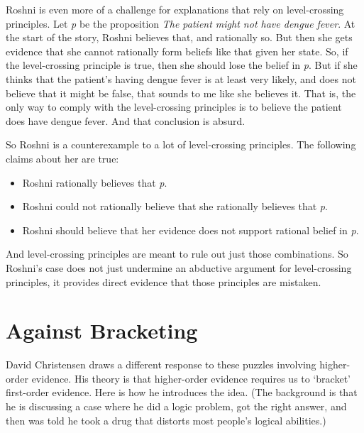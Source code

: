 \documentclass[
  10pt,
  letterpaper,
  twoside]{scrbook}
\providecommand{\tightlist}{%
  \setlength{\itemsep}{0pt}\setlength{\parskip}{0pt}}\usepackage{longtable,booktabs,array}
\begin{document}
{Roshni} is even more of a challenge for explanations that rely on
level-crossing principles. Let \emph{p} be the proposition \emph{The
patient might not have dengue fever}. At the start of the story,
{Roshni} believes that, and rationally so. But then she gets evidence
that she cannot rationally form beliefs like that given her state. So,
if the level-crossing principle is true, then she should lose the belief
in \emph{p}. But if she thinks that the patient's having dengue fever is
at least very likely, and does not believe that it might be false, that
sounds to me like she believes it. That is, the only way to comply with
the level-crossing principles is to believe the patient does have dengue
fever. And that conclusion is absurd.

So {Roshni} is a counterexample to a lot of level-crossing principles.
The following claims about her are true:

\begin{itemize}
\tightlist
\item
  {Roshni} rationally believes that \emph{p}.
\item
  {Roshni} could not rationally believe that she rationally believes
  that \emph{p}.
\item
  {Roshni} should believe that her evidence does not support rational
  belief in \emph{p}.
\end{itemize}

And level-crossing principles are meant to rule out just those
combinations. So {Roshni}'s case does not just undermine an abductive
argument for level-crossing principles, it provides direct evidence that
those principles are mistaken.

\section{Against Bracketing}\label{againstbracketing}

David Christensen draws a different response to these puzzles involving
higher-order evidence. His theory is that higher-order evidence requires
us to `bracket' first-order evidence. Here is how he introduces the
idea. (The background is that he is discussing a case where he did a
logic problem, got the right answer, and then was told he took a drug
that distorts most people's logical abilities.)
\end{document}
